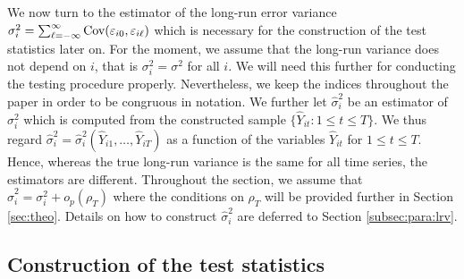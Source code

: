 \documentclass[a4paper,12pt]{article}
\begin{document}
We now turn to the estimator of the long-run error variance $\sigma_i^2 = \sum\nolimits_{\ell=-\infty}^{\infty} \textnormal{Cov}(\varepsilon_{i0}, \varepsilon_{i\ell})$ which is necessary for the construction of the test statistics later on. For the moment, we assume that the long-run variance does not depend on $i$, that is $\sigma_i^2 = \sigma^2$ for all $i$. We will need this further for conducting the testing procedure properly. Nevertheless, we keep the indices throughout the paper in order to be congruous in notation. We further let $\widehat{\sigma}_i^2$ be an estimator of $\sigma_i^2$ which is computed from the constructed sample $\{ \widehat{Y}_{it}: 1 \le t \le T \}$. We thus regard $\widehat{\sigma}_i^2 = \widehat{\sigma}_i^2(\widehat{Y}_{i1},\ldots,\widehat{Y}_{iT})$ as a function of the variables $\widehat{Y}_{it}$ for $1 \le t \le T$. Hence, whereas the true long-run variance is the same for all time series, the estimators are different. Throughout the section, we assume that $\widehat{\sigma}_i^2 = \sigma_i^2 + o_p(\rho_T)$ where the conditions on $\rho_T$ will be provided further in Section \ref{sec:theo}. Details on how to construct $\widehat{\sigma}_i^2$ are deferred to Section \ref{subsec:para:lrv}. 

\subsection{Construction of the test statistics}\label{subsec:test:stat}
\end{document}
